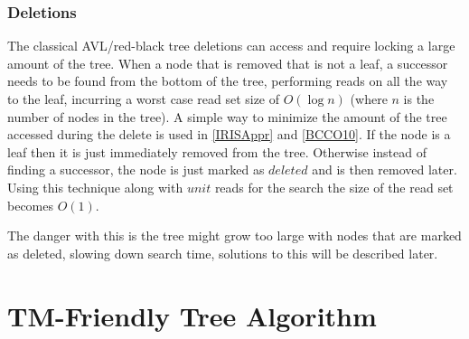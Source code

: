 \documentclass[10pt]{sigplanconf}
\begin{document}
\subsubsection{Deletions}
The classical AVL/red-black tree deletions can access and require locking a large amount of the tree.
When a node that is removed that is not a leaf, a successor needs to be found from the bottom of the tree, performing reads on all the way to the leaf, incurring a worst case
read set size of $O(\log{n})$ (where $n$ is the number of nodes in the tree).
A simple way to minimize the amount of the tree accessed during the delete is used in \ref{IRISAppr} and \ref{BCCO10}.
If the node is a leaf then it is just immediately removed from the tree.
Otherwise instead of finding a successor, the node is just marked as $deleted$ and is then removed later.
Using this technique along with $unit$ reads for the search the size of the read set becomes $O(1)$.

The danger with this is the tree might grow too large with nodes that are marked as deleted, slowing down search time, solutions to this will be
described later.


\section{TM-Friendly Tree Algorithm}
%
%   	
%   	
%		
%		
%		
%		
\end{document}
